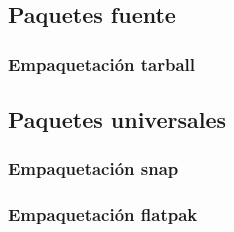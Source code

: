 \documentclass[a4paper, 11pt, titlepage]{article}
\begin{document}

            

            
    \subsection{Paquetes fuente}

        \subsubsection{Empaquetación tarball}

    \subsection{Paquetes universales}

        \subsubsection{Empaquetación snap}

        \subsubsection{Empaquetación flatpak}
\end{document}

